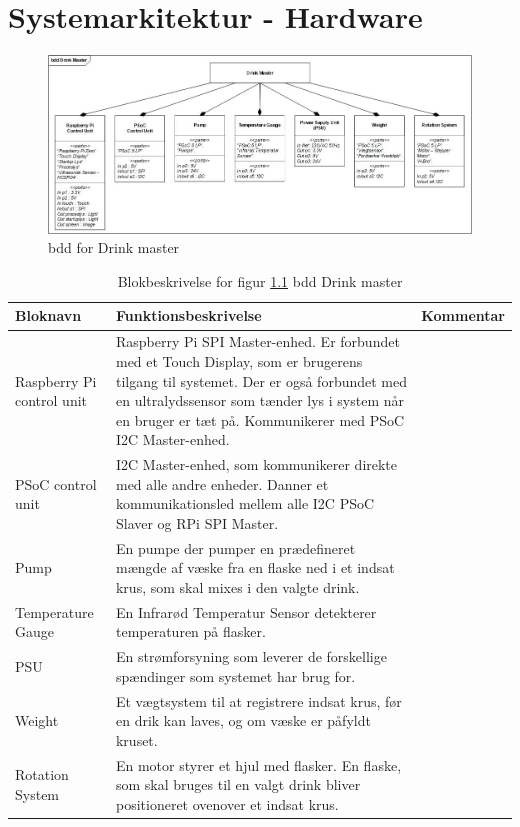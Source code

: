 \chapter{Systemarkitektur - Hardware}

\begin{figure}[h!]
	\centering
	\includegraphics[width=1.2\textwidth, angle =270]{Images/BDD_System_JPEG.jpg}
	\caption{bdd for Drink master}
	\label{fig:bdd}
\end{figure}
\FloatBarrier

\begin{table}[!h] 
	\centering 
	\caption{Blokbeskrivelse for figur \ref{fig:bdd} bdd Drink master}
	\begin{tabular}{|p{3cm}|p{7cm}|p{3cm}|}
		\hline
\textbf{Bloknavn} & \textbf{Funktionsbeskrivelse}  &  \textbf{Kommentar}  \\ \hline
Raspberry Pi control unit    & Raspberry Pi SPI Master-enhed. Er forbundet med et Touch Display, som er brugerens tilgang til systemet. Der er også forbundet med en ultralydssensor som tænder lys i system når en bruger er tæt på. Kommunikerer med PSoC I2C Master-enhed. &  \\ \hline
PSoC control unit & I2C Master-enhed, som kommunikerer direkte med alle andre enheder. Danner et kommunikationsled mellem alle I2C PSoC Slaver og RPi SPI Master.    &  \\ \hline
Pump              & En pumpe der pumper en prædefineret mængde af væske fra en flaske ned i et indsat krus, som skal mixes i den valgte drink.                       &  \\ \hline
Temperature Gauge & En Infrarød Temperatur Sensor detekterer temperaturen på flasker.                                                                                &  \\ \hline
PSU               & En strømforsyning som leverer de forskellige spændinger som systemet har brug for.                                                                               &  \\  \hline
Weight            & Et vægtsystem til at registrere indsat krus, før en drik kan laves, og om væske er påfyldt kruset.                                                                      &  \\ \hline
Rotation System   & En motor styrer et hjul med flasker. En flaske, som skal bruges til en valgt drink bliver positioneret ovenover et indsat krus.                  &  \\ \hline

		\hline 
	\end{tabular}
	\label{tab:blokbeskrivelse}
\end{table}
\FloatBarrier

